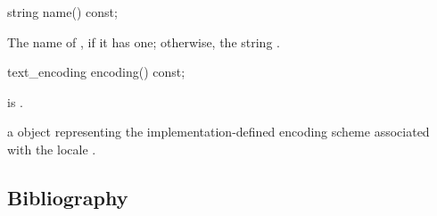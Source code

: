 \documentclass{wg21}
\begin{document}
\begin{itemdecl}
string name() const;
\end{itemdecl}

\begin{itemdescr}
\pnum
\returns
The name of
,
if it has one; otherwise, the string .
\end{itemdescr}

\begin{addedblock}
\begin{itemdecl}
text_encoding encoding() const;
\end{itemdecl}

\begin{itemdescr}

\mandates {} is . 
    
\returns a  object representing the implementation-defined encoding scheme associated with the locale .

\end{itemdescr}

%
%   
%    
% 
\end{addedblock}

\subsection{Bibliography}
\end{document}
